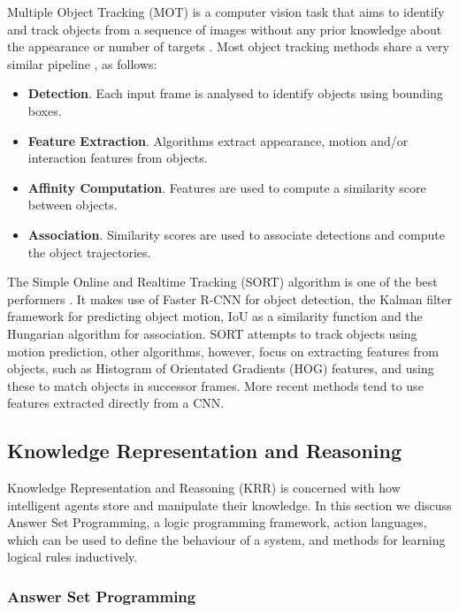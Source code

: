 \documentclass[../interim.tex]{subfiles}
\begin{document}
Multiple Object Tracking (MOT) is a computer vision task that aims to identify and track objects from a sequence of images without any prior knowledge about the appearance or number of targets \cite{obj-tracking-survey}. Most object tracking methods share a very similar pipeline \cite{obj-tracking-survey}, as follows:
\begin{itemize}
  \item \textbf{Detection}. Each input frame is analysed to identify objects using bounding boxes.

  \item \textbf{Feature Extraction}. Algorithms extract appearance, motion and/or interaction features from objects.

  \item \textbf{Affinity Computation}. Features are used to compute a similarity score between objects.

  \item \textbf{Association}. Similarity scores are used to associate detections and compute the object trajectories.
\end{itemize}

The Simple Online and Realtime Tracking (SORT) \cite{sort-obj-tracking} algorithm is one of the best performers \cite{obj-tracking-survey}. It makes use of Faster R-CNN for object detection, the Kalman filter \cite{kalman-filter} framework for predicting object motion, IoU as a similarity function and the Hungarian algorithm \cite{hungarian-algo} for association. SORT attempts to track objects using motion prediction, other algorithms, however, focus on extracting features from objects, such as Histogram of Orientated Gradients (HOG) \cite{hog-features} features, and using these to match objects in successor frames. More recent methods tend to use features extracted directly from a CNN.


\subsection{Knowledge Representation and Reasoning}

Knowledge Representation and Reasoning (KRR) is concerned with how intelligent agents store and manipulate their knowledge. In this section we discuss Answer Set Programming, a logic programming framework, action languages, which can be used to define the behaviour of a system, and methods for learning logical rules inductively.

\subsubsection{Answer Set Programming}
\end{document}

